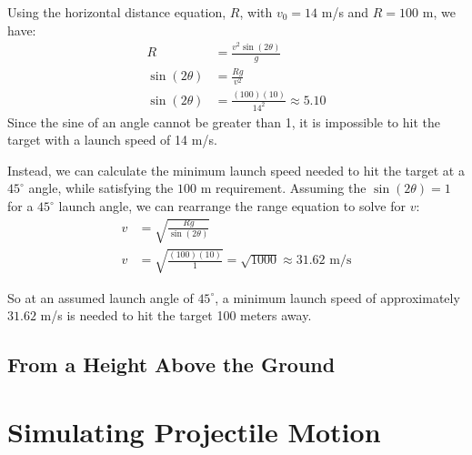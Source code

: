 \begin{Answer}[ref=projectiles_angle3]

Using the horizontal distance equation, $R$, with $v_0 = 14$ m/s and $R = 100$ m, we have:
\begin{align*}
R&=\frac{v^2\sin(2\theta)}{g} \\ 
\sin(2\theta) &= \frac{Rg}{v^2} \\
\sin(2\theta) &= \frac{(100)(10)}{14^2} \approx 5.10
\end{align*}
Since the sine of an angle cannot be greater than 1, it is impossible to hit the target with a launch speed of 14 m/s.

Instead, we can calculate the minimum launch speed needed to hit the target at a $45^\circ$ angle, while satisfying the $100$ m requirement. Assuming the $\sin(2\theta) = 1$ for a $45^\circ$ launch angle, we can rearrange the range equation to solve for $v$:
\begin{align*}
v &= \sqrt{\frac{Rg}{\sin(2\theta)}} \\
v &= \sqrt{\frac{(100)(10)}{1}} = \sqrt{1000} \approx 31.62 \text{ m/s}
\end{align*}

So at an assumed launch angle of $45^\circ$, a minimum launch speed of approximately $31.62$ m/s is needed to hit the target 100 meters away.
\end{Answer}


\subsection{From a Height Above the Ground}




\section{Simulating Projectile Motion}

